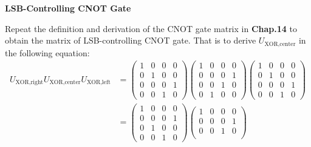 \documentclass[a4paper, 10pt]{article}
\begin{document}
\begin{problem}
\textbf{LSB-Controlling CNOT Gate}
\par Repeat the definition and derivation of the CNOT gate matrix in \textbf{Chap.14} to obtain the matrix of LSB-controlling CNOT gate.
That is to derive \( U_{\text{XOR}, \text{center}}\) in the following equation:
\begin{align*}
	U_{\text{XOR}, \text{right}} U_{\text{XOR}, \text{center}} U_{\text{XOR}, \text{left}}
	 & = \begin{pmatrix}
		     1 & 0 & 0 & 0 \\
		     0 & 1 & 0 & 0 \\
		     0 & 0 & 0 & 1 \\
		     0 & 0 & 1 & 0
	     \end{pmatrix} \begin{pmatrix}
		                   1 & 0 & 0 & 0 \\
		                   0 & 0 & 0 & 1 \\
		                   0 & 0 & 1 & 0 \\
		                   0 & 1 & 0 & 0
	                   \end{pmatrix} \begin{pmatrix}
		                                 1 & 0 & 0 & 0 \\
		                                 0 & 1 & 0 & 0 \\
		                                 0 & 0 & 0 & 1 \\
		                                 0 & 0 & 1 & 0
	                                 \end{pmatrix} \\
	 & = \begin{pmatrix}
		     1 & 0 & 0 & 0 \\
		     0 & 0 & 0 & 1 \\
		     0 & 1 & 0 & 0 \\
		     0 & 0 & 1 & 0
	     \end{pmatrix} \begin{pmatrix}
		                   1 & 0 & 0 & 0 \\
		                   0 & 0 & 0 & 1 \\
		                   0 & 0 & 1 & 0 \\

\end{pmatrix}
\end{align*}
\end{problem}
\end{document}
